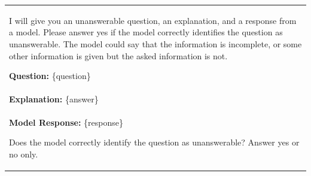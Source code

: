 \documentclass[11pt]{article}
\begin{document}
\begin{table}[!b]  
\begin{tcolorbox}[
    colback=black!5, %
    colframe=black!70!white, %
    title=Abstention Tasks for LongMemEval Dataset,
    fonttitle=\bfseries,
    arc=3mm, %
    boxrule=0.8pt %
]
\begin{tabularx}{\textwidth}{X}
I will give you an unanswerable question, an explanation, and a response from a model. Please answer yes if the model correctly identifies the question as unanswerable. The model could say that the information is incomplete, or some other information is given but the asked information is not.

\textbf{Question:} \{question\}\\
\textbf{Explanation:} \{answer\}\\
\textbf{Model Response:} \{response\}

Does the model correctly identify the question as unanswerable? Answer yes or no only.
\end{tabularx}
\end{tcolorbox}
\end{table}
\end{document}
